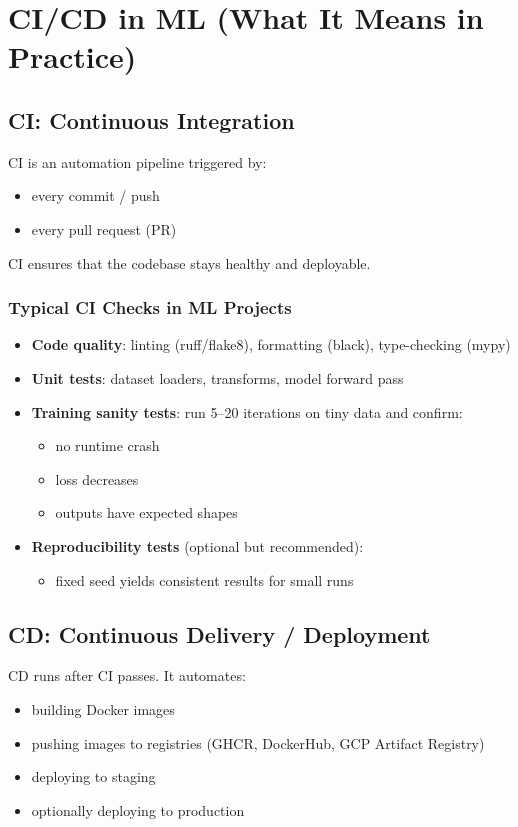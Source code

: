 \documentclass[11pt]{article}
\begin{document}
\section{CI/CD in ML (What It Means in Practice)}

\subsection{CI: Continuous Integration}
CI is an automation pipeline triggered by:
\begin{itemize}
  \item every commit / push
  \item every pull request (PR)
\end{itemize}

CI ensures that the codebase stays healthy and deployable.

\subsubsection{Typical CI Checks in ML Projects}
\begin{itemize}
  \item \textbf{Code quality}: linting (ruff/flake8), formatting (black), type-checking (mypy)
  \item \textbf{Unit tests}: dataset loaders, transforms, model forward pass
  \item \textbf{Training sanity tests}: run 5--20 iterations on tiny data and confirm:
    \begin{itemize}
      \item no runtime crash
      \item loss decreases
      \item outputs have expected shapes
    \end{itemize}
  \item \textbf{Reproducibility tests} (optional but recommended):
    \begin{itemize}
      \item fixed seed yields consistent results for small runs
    \end{itemize}
\end{itemize}

\subsection{CD: Continuous Delivery / Deployment}
CD runs after CI passes. It automates:
\begin{itemize}
  \item building Docker images
  \item pushing images to registries (GHCR, DockerHub, GCP Artifact Registry)
  \item deploying to staging
  \item optionally deploying to production
\end{itemize}
\end{document}
